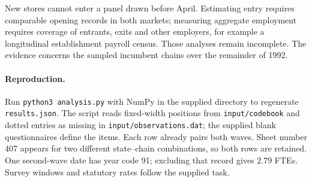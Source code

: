 \documentclass[11pt]{article}
\begin{document}
New stores cannot enter a panel drawn before April. Estimating entry requires comparable opening records in both markets; measuring aggregate employment requires coverage of entrants, exits and other employers, for example a longitudinal establishment payroll census. Those analyses remain incomplete. The evidence concerns the sampled incumbent chains over the remainder of 1992.

\small\raggedright\paragraph{Reproduction.} Run \texttt{python3 analysis.py} with NumPy in the supplied directory to regenerate \texttt{results.json}. The script reads fixed-width positions from \texttt{input/codebook} and dotted entries as missing in \texttt{input/observations.dat}; the supplied blank questionnaires define the items. Each row already pairs both waves. Sheet number 407 appears for two different state--chain combinations, so both rows are retained. One second-wave date has year code 91; excluding that record gives 2.79 FTEs. Survey windows and statutory rates follow the supplied task.
\end{document}
